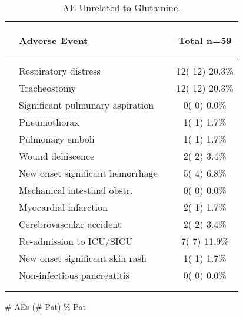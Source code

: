 \documentclass[dvips,10pt]{article}
\begin{document}
\begin{table}[t]
\caption
{ AE Unrelated to Glutamine. }
\begin{center}
\begin{tabular}{ @{}l@{}
@{}l@{}@{}p{1.5em}@{}@{}c@{}
}
\hline

& \parbox{6em}{\begin{center}Adverse Event\end{center}} && \parbox{6em}{\begin{center}Total n=59\end{center}} \\

\hline

\\
& Respiratory distress && 12( 12) 20.3\% \\
& Tracheostomy && 12( 12) 20.3\% \\
& Significant pulmunary aspiration && 0(  0)  0.0\% \\
& Pneumothorax && 1(  1)  1.7\% \\
& Pulmonary emboli && 1(  1)  1.7\% \\
& Wound dehiscence && 2(  2)  3.4\% \\
& New onset significant hemorrhage && 5(  4)  6.8\% \\
& 
Mechanical intestinal obstr. && 0(  0)  0.0\% \\
& Myocardial infarction && 2(  1)  1.7\% \\
& Cerebrovascular accident && 2(  2)  3.4\% \\
& Re-admission to ICU/SICU && 7(  7) 11.9\% \\
& New onset significant skin rash && 1(  1)  1.7\% \\
& 
Non-infectious pancreatitis && 0(  0)  0.0\% \\
\\
\hline \\

\end{tabular}


\parbox{ 5in }{ \# AEs (\# Pat) \% Pat } \\
 \vspace{1em}\end{center}
 \end{table}
\end{document}
